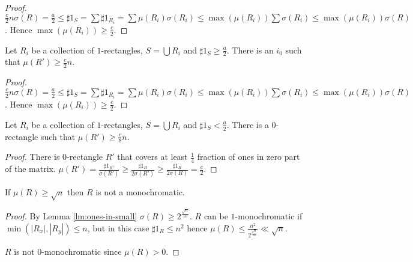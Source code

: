\begin{proof}
    $\frac{c}{2} n \sigma(R) = \frac{a}{2} \le \sharp 1_{S} = \sum \sharp 1_{R_i} = \sum \mu(R_i)
    \sigma(R_i) \le \max(\mu(R_i)) \sum \sigma(R_i) \le \max(\mu(R_i)) \sigma(R)$. Hence $\max(\mu(R_i))
    \ge \frac{c}{2}$.
\end{proof}

\begin{lemma}
    Let $R_i$ be a collection of $1$-rectangles, $S = \bigcup R_i$ and $\sharp 1_{S} \ge
    \frac{a}{2}$. There is an $i_0$ such that $\mu(R') \ge \frac{c}{2} n$.
\end{lemma}

\begin{proof}
    $\frac{c}{2} n \sigma(R) = \frac{a}{2} \le \sharp 1_{S} = \sum \sharp 1_{R_i} = \sum \mu(R_i)
    \sigma(R_i) \le \max(\mu(R_i)) \sum \sigma(R_i) \le \max(\mu(R_i)) \sigma(R)$. Hence $\max(\mu(R_i))
    \ge \frac{c}{2}$.
\end{proof}


\begin{lemma}
    Let $R_i$ be a collection of $1$-rectangles, $S = \bigcup R_i$ and $\sharp 1_{S} <
    \frac{a}{2}$. There is a $0$-rectangle such that $\mu(R') \ge \frac{c}{8} n$.
\end{lemma}

\begin{proof}
    There is $0$-rectangle $R'$ that covers at least $\frac{1}{4}$ fraction of ones in zero part of the
    matrix. $\mu(R') = \frac{\sharp 1_{R'}}{\sigma(R')} \ge \frac{\sharp 1_{R}}{2 \sigma(R')} \ge
    \frac{\sharp 1_{R}}{2 \sigma(R)} = \frac{c}{2}$.
\end{proof}


\begin{lemma}
    If $\mu(R) \ge \sqrt{n}$ then $R$ is not a monochromatic.
\end{lemma}

\begin{proof}
    By Lemma \ref{lm:ones-in-small} $\sigma(R) \ge 2^{\frac{\sqrt{n}}{10}}$. $R$ can be $1$-monochromatic
    if $\min(|R_x|, |R_y|) \le n$, but in this case $\sharp 1_{R} \le n^2$ hence $\mu(R) \le
    \frac{n^2}{2^{\frac{\sqrt{n}}{10}}} \ll \sqrt{n}$.

    $R$ is not $0$-monochromatic since $\mu(R) > 0$.
\end{proof}
